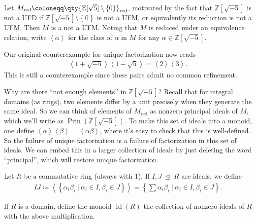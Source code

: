 \begin{remark}

Let
\(M_{{ \text{red} }} \coloneqq\qty{{\mathbb{Z}}[ \sqrt{5} ] \setminus\left\{{0}\right\}}_{{ \text{red} }}\),
motivated by the fact that \({\mathbb{Z}}[ \sqrt{-5} ]\) is not a UFD if
\({\mathbb{Z}}[ \sqrt{-5} ] \setminus\left\{{0}\right\}\) is not a UFM,
or equivalently its reduction is not a UFM. Then \(M\) is a not a UFM.
Noting that \(M\) is reduced under an equivalence relation, write
\(\left\langle{ \alpha}\right\rangle\) for the class of \(\alpha\) in
\(M\) for any \(\alpha\in {\mathbb{Z}}[ \sqrt{-5} ]\).

Our original counterexample for unique factorization now reads
\begin{align*}
\left\langle{ 1 + \sqrt{-5} }\right\rangle \left\langle{ 1 - \sqrt{5} }\right\rangle = \left\langle{2}\right\rangle \left\langle{3}\right\rangle
.\end{align*}
This is still a counterexample since these pairs admit no common
refinement.

Why are there ``not enough elements'' in \({\mathbb{Z}}[ \sqrt{-5} ]\)?
Recall that for integral domains (as rings), two elements differ by a
unit precisely when they generate the same ideal. So we can think of
elements of \(M_{{ \text{red} }}\) as nonzero principal ideals of \(M\),
which we'll write as
\(\operatorname{Prin}( {\mathbb{Z}}[ \sqrt{-5} ])\). To make this set of
ideals into a monoid, one define
\(\left\langle{ \alpha }\right\rangle \left\langle{ \beta }\right\rangle= \left\langle{ \alpha \beta }\right\rangle\),
where it's easy to check that this is well-defined. So the failure of
unique factorization is a failure of factorization in this set of
ideals. We can embed this in a larger collection of ideals by just
deleting the word ``principal'', which will restore unique
factorization.

\end{remark}

\begin{definition}

Let \(R\) be a commutative ring (always with 1). If
\(I, J {~\trianglelefteq~}R\) are ideals, we define
\begin{align*}
IJ \coloneqq\left\langle{ \left\{{ \alpha_i \beta_i {~\mathrel{\Big|}~}\alpha_i \in I, \beta_i \in J }\right\}}\right\rangle = \left\{{ \sum \alpha_i \beta_i {~\mathrel{\Big|}~}\alpha_i \in I, \beta_i \in J}\right\}
.\end{align*}

If \(R\) is a domain, define the monoid \(\operatorname{Id}(R)\) the
collection of nonzero ideals of \(R\) with the above multiplication.

\end{definition}

